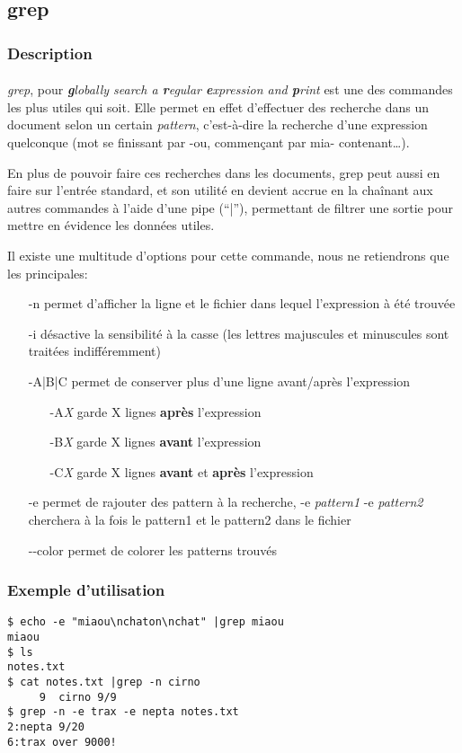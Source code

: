 \subsection*{grep}
\subsubsection*{Description}

\paragraph{}
\emph{grep}, pour \emph{\textbf{g}lobally search a \textbf{r}egular
\textbf{e}xpression and \textbf{p}rint} est une des commandes les plus utiles
qui soit.  Elle permet en effet d'effectuer des recherche dans un document
selon un certain \emph{pattern}, c'est-à-dire la recherche d'une expression
quelconque (mot se finissant par -ou, commençant par mia- contenant\ldots).

En plus de pouvoir faire ces recherches dans les documents, grep peut aussi en
faire sur l'entrée standard, et son utilité en devient accrue en la chaînant
aux autres commandes à l'aide d'une pipe (``|''), permettant de filtrer une
sortie pour mettre en évidence les données utiles.

Il existe une multitude d'options pour cette commande, nous ne retiendrons que
les principales:
\begin{itemize}
\item[-n] permet d'afficher la ligne et le fichier dans lequel l'expression à
	été trouvée
\item[-i] désactive la sensibilité à la casse (les lettres majuscules et
	minuscules sont traitées indifféremment)
\item[-A|B|C] permet de conserver plus d'une ligne avant/après l'expression
	\begin{itemize}
		\item[-A\emph{X}] garde X lignes \textbf{après} l'expression
		\item[-B\emph{X}] garde X lignes \textbf{avant} l'expression
		\item[-C\emph{X}] garde X lignes \textbf{avant} et \textbf{après}
			l'expression
	\end{itemize}
\item[-e] permet de rajouter des pattern à la recherche, -e \emph{pattern1} -e
	\emph{pattern2} cherchera à la fois le pattern1 et le pattern2 dans le
	fichier
\item[-{}-color] permet de colorer les patterns trouvés
\end{itemize}

\subsubsection*{Exemple d'utilisation}

\begin{lstlisting}
$ echo -e "miaou\nchaton\nchat" |grep miaou
miaou
$ ls
notes.txt
$ cat notes.txt |grep -n cirno
     9  cirno 9/9
$ grep -n -e trax -e nepta notes.txt
2:nepta 9/20
6:trax over 9000!
\end{lstlisting}
